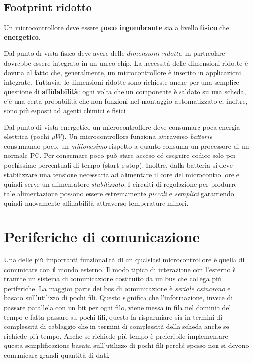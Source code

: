 \documentclass[12pt, a4paper]{report}
\begin{document}
\subsection{Footprint ridotto}
Un microcontrollore deve essere \textbf{poco ingombrante} sia a livello \textbf{fisico} che \textbf{energetico}.

Dal punto di vista fisico deve avere delle \textit{dimensioni ridotte}, in particolare dovrebbe essere integrato in un unico chip. La necessità delle dimensioni ridotte è dovuta al fatto che, generalmente, un microcontrollore è inserito in applicazioni integrate. Tuttavia, le dimensioni ridotte sono richieste anche per una semplice questione di \textbf{affidabilità}: ogni volta che un componente è saldato su una scheda, c'è una certa probabilità che non funzioni nel montaggio automatizzato e, inoltre, sono più esposti ad agenti chimici e fisici.

Dal punto di vista energetico un microcontrollore deve consumare poca energia elettrica (pochi $\mu W$). Un microcontrollore funziona attraverso \textit{batterie} consumando poco, un \textit{milionesimo} rispetto a quanto consuma un processore di un normale PC. Per consumare poco può stare acceso ed eseguire codice solo per pochissime percentuali di tempo (start e stop). Inoltre, dalla batteria si deve stabilizzare una tensione necessaria ad alimentare il core del microcontrollore e quindi serve un alimentatore \textit{stabilizzato}. I circuiti di regolazione per produrre tale alimentazione possono essere estremamente \textit{piccoli} e \textit{semplici} garantendo quindi nuovamente affidabilità attraverso temperature minori.

\section{Periferiche di comunicazione}
Una delle più importanti funzionalità di un qualsiasi microcontrollore è quella di comunicare con il mondo esterno. Il modo tipico di interazione con l'esterno è tramite un sistema di comunicazione costituito da un bus che collega più periferiche. La maggior parte dei bus di comunicazione è \textit{seriale asincrono} e basato sull'utilizzo di pochi fili. Questo significa che l'informazione, invece di passare parallela con un bit per ogni filo, viene messa in fila nel dominio del tempo e fatta passare su pochi fili, questo fa risparmiare sia in termini di complessità di cablaggio che in termini di complessità della scheda anche se richiede più tempo. Anche se richiede più tempo è preferibile implementare questa semplificazione basata sull'utilizzo di pochi fili perché spesso non si devono comunicare grandi quantità di dati.
\end{document}
